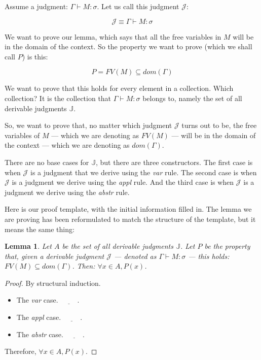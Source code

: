 \documentclass{book}
\numberwithin{equation}{chapter}
\newcommand{\blank}{\underline{\hspace{1cm}}}
\newtheorem*{anon-lemma}{Lemma}
\begin{document}
Assume a judgment: $\Gamma \vdash M : \sigma$. Let us call this judgment $\mathcal{J}$:

\begin{equation*}
\mathcal{J} \equiv \Gamma \vdash M : \sigma
\end{equation*}

\noindent
We want to prove our lemma, which says that all the free variables in $M$ will be in the domain of the context. So the property we want to prove (which we shall call $P$) is this: 

\begin{equation*}
P = FV(M) \subseteq dom(\Gamma)
\end{equation*}

\noindent
We want to prove that this holds for every element in a collection. Which collection? It is the collection that $\Gamma \vdash M : \sigma$ belongs to, namely the set of all derivable judgments $\mathbb{J}$. 

So, we want to prove that, no matter which judgment $\mathcal{J}$ turns out to be, the free variables of $M$ --- which we are denoting as $FV(M)$ --- will be in the domain of the context --- which we are denoting as $dom(\Gamma)$.

There are no base cases for $\mathbb{J}$, but there are three constructors.
The first case is when $\mathcal{J}$ is a judgment that we derive using the \textit{var} rule. The second case is when $\mathcal{J}$ is a judgment we derive using the \textit{appl} rule. And the third case is when $\mathcal{J}$ is a judgment we derive using the \textit{abstr} rule.

Here is our proof template, with the initial information filled in. The lemma we are proving has been reformulated to match the structure of the template, but it means the same thing:

\noindent
\hrulefill

\begin{anon-lemma}
Let $A$ be the set of all derivable judgments $\mathbb{J}$. Let $P$ be the property that, given a derivable judgment $\mathcal{J}$ --- denoted as $\Gamma \vdash M : \sigma$ --- this holds: $FV(M) \subseteq dom(\Gamma)$. Then: $\forall x \in A, P(x)$.
\end{anon-lemma}

\begin{proof}
By structural induction.

\begin{itemize}
\item{The \textit{var} case. $\blank$.}
\item{The \textit{appl} case. $\blank$.}
\item{The \textit{abstr} case. $\blank$.}
\end{itemize}

\noindent
Therefore, $\forall x \in A, P(x)$.
\end{proof}
\end{document}

